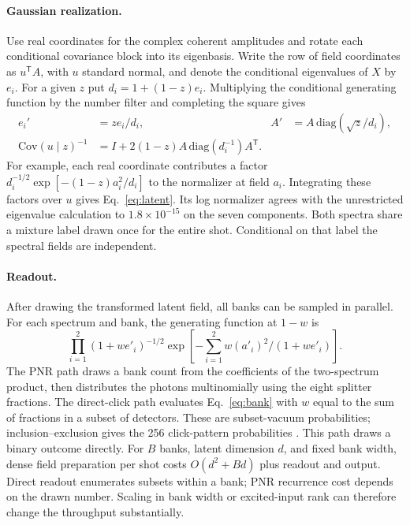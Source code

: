 \documentclass[11pt]{article}
\begin{document}
\paragraph{Gaussian realization.}
Use real coordinates for the complex coherent amplitudes and rotate each conditional covariance block into its eigenbasis. Write the row of field coordinates as $u^\mathsf{T}A$, with $u$ standard normal, and denote the conditional eigenvalues of $X$ by $e_i$. For a given $z$ put $d_i=1+(1-z)e_i$. Multiplying the conditional generating function by the number filter and completing the square gives
\begin{align}
 e_i'&=ze_i/d_i, & A'&= A\,\mathrm{diag}(\sqrt{z}/d_i),\\
 \mathrm{Cov}(u\mid z)^{-1}
     &=I+2(1-z)A\,\mathrm{diag}(d_i^{-1})A^\mathsf T. \label{eq:latent}
\end{align}
For example, each real coordinate contributes a factor
$d_i^{-1/2}\exp[-(1-z)a_i^2/d_i]$ to the normalizer at field $a_i$. Integrating these factors over $u$ gives Eq.~\eqref{eq:latent}. Its log normalizer agrees with the unrestricted eigenvalue calculation to $1.8\times10^{-15}$ on the seven components. Both spectra share a mixture label drawn once for the entire shot. Conditional on that label the spectral fields are independent.

\paragraph{Readout.}
After drawing the transformed latent field, all banks can be sampled in parallel. For each spectrum and bank, the generating function at $1-w$ is
\begin{equation}
 \prod_{i=1}^2(1+w e'_i)^{-1/2}
       \exp\!\left[-\sum_{i=1}^2 w(a'_i)^2/(1+w e'_i)\right].
 \label{eq:bank}
\end{equation}
The PNR path draws a bank count from the coefficients of the two-spectrum product, then distributes the photons multinomially using the eight splitter fractions. The direct-click path evaluates Eq.~\eqref{eq:bank} with $w$ equal to the sum of fractions in a subset of detectors. These are subset-vacuum probabilities; inclusion--exclusion gives the 256 click-pattern probabilities \cite{threshold}. This path draws a binary outcome directly. For $B$ banks, latent dimension $d$, and fixed bank width, dense field preparation per shot costs $O(d^2+Bd)$ plus readout and output. Direct readout enumerates subsets within a bank; PNR recurrence cost depends on the drawn number. Scaling in bank width or excited-input rank can therefore change the throughput substantially.
\end{document}
